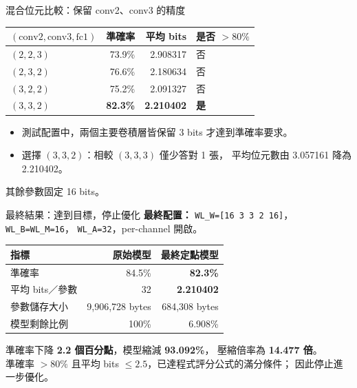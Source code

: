 \documentclass[aspectratio=169,11pt]{beamer}
\begin{document}
\begin{frame}{混合位元比較：保留 conv2、conv3 的精度}
  \small
  \centering
  \begin{tabular}{lrrl}
    \toprule
    $(\text{conv2},\text{conv3},\text{fc1})$ & 準確率 & 平均 bits & 是否 $>80\%$ \\
    \midrule
    $(2,2,3)$ & 73.9\% & 2.908317 & 否 \\
    $(2,3,2)$ & 76.6\% & 2.180634 & 否 \\
    $(3,2,2)$ & 75.2\% & 2.091327 & 否 \\
    \textbf{$(3,3,2)$} & \textbf{82.3\%} & \textbf{2.210402} & \textbf{是} \\
    \bottomrule
  \end{tabular}

  \vspace{0.8em}
  \begin{itemize}
    \item 測試配置中，兩個主要卷積層皆保留 3 bits 才達到準確率要求。
    \item 選擇 $(3,3,2)$：相較 $(3,3,3)$ 僅少答對 1 張，
          平均位元數由 3.057161 降為 2.210402。
  \end{itemize}
  \footnotesize
  其餘參數固定 16 bits。
\end{frame}

\begin{frame}{最終結果：達到目標，停止優化}
  \small
  \textbf{最終配置：}
  \texttt{WL\_W=[16 3 3 2 16]}，\texttt{WL\_B=WL\_M=16}，
  \texttt{WL\_A=32}，per-channel 開啟。

  \vspace{0.6em}
  \centering
  \begin{tabular}{lrr}
    \toprule
    指標 & 原始模型 & 最終定點模型 \\
    \midrule
    準確率 & 84.5\% & \textbf{82.3\%} \\
    平均 bits／參數 & 32 & \textbf{2.210402} \\
    參數儲存大小 & 9,906,728 bytes & 684,308 bytes \\
    模型剩餘比例 & 100\% & 6.908\% \\
    \bottomrule
  \end{tabular}

  \vspace{0.5em}
  \begin{flushleft}
    準確率下降 \textbf{2.2 個百分點}，模型縮減 \textbf{93.092\%}，
    壓縮倍率為 \textbf{14.477 倍}。\\[0.4em]
    準確率 $>80\%$ 且平均 bits $\leq2.5$，已達程式評分公式的滿分條件；
    因此停止進一步優化。
  \end{flushleft}
\end{frame}
\end{document}
